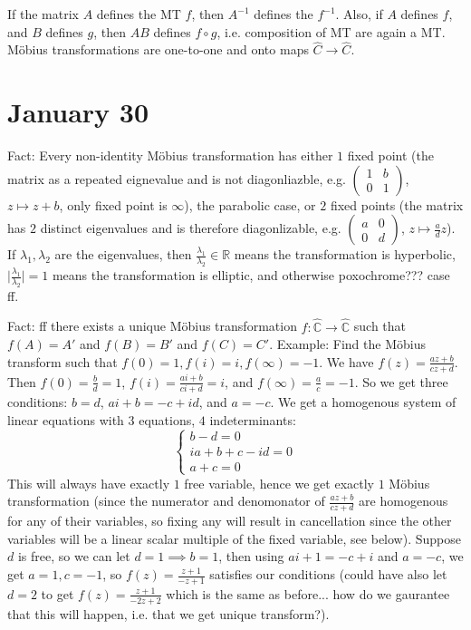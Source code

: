 \documentclass{article}
\theoremstyle{plain}
\theoremstyle{remark}
\newcommand{\R}{{\mathbb R}}
\newcommand{\C}{{\mathbb C}}
\begin{document}
If the matrix $A$ defines the MT $f$, then $A^{-1}$ defines the $f^{-1}$.
Also, if $A$ defines $f$, and $B$ defines $g$, then $AB$ defines $f \circ g$,
i.e. composition of MT are again a MT.
M\"{o}bius transformations are one-to-one and onto maps $\hat{C} \to \hat{C}$.

\section{January 30}
Fact: Every non-identity M\"{o}bius transformation has either 
$1$ fixed point (the matrix as a repeated eignevalue and is not diagonliazble,
e.g. $\begin{pmatrix} 1 & b \\ 0 & 1 \end{pmatrix}$, $z \mapsto z + b$,
only fixed point is $\infty$), the parabolic case,
or $2$ fixed points (the matrix has $2$ distinct eigenvalues
and is therefore diagonlizable,
e.g. $\begin{pmatrix} a & 0 \\ 0 & d \end{pmatrix}$, $z \mapsto \frac{a}{d}z$).
If $\lambda_1,\lambda_2$ are the eigenvalues, then $\frac{\lambda_1}{\lambda_2}\in\R$
means the transformation is hyperbolic,
$\lvert \frac{\lambda_1}{\lambda_2}\rvert = 1$ means the transformation is elliptic,
and otherwise poxochrome??? case ff.

Fact: ff there exists a unique M\"{o}bius transformation
$f \colon \hat{\C} \to \hat{\C}$ such that $f(A) = A'$
and $f(B) = B'$ and $f(C) = C'$.
Example: Find the M\"{o}bius transform such that
$f(0) = 1, f(i) = i, f(\infty) = -1$.
We have $f(z) = \frac{az+b}{cz+d}$.
Then $f(0) = \frac{b}{d} = 1$,
$f(i) = \frac{ai + b}{ci + d} = i$, and $f(\infty) = \frac{a}{c} = -1$.
So we get three conditions: $b = d$, $ai + b = -c + id$, and $a = -c$.
We get a homogenous system of linear equations with $3$ equations, $4$ indeterminants:
\[
	\begin{cases}
		b - d = 0\\
		ia + b + c -id = 0\\
		a + c = 0
	\end{cases}
\]
This will always have exactly $1$ free variable,
hence we get exactly $1$ M\"{o}bius transformation
(since the numerator and denomonator of $\frac{az+b}{cz+d}$ are
homogenous for any of their variables,
so fixing any will result in cancellation since the other variables
will be a linear scalar multiple of the fixed variable, see below).
Suppose $d$ is free, so we can let $d = 1 \implies b = 1$,
then using $ai + 1 = -c + i$ and $a = -c$, we get $a = 1, c = -1$,
so $f(z) = \frac{z+1}{-z+1}$ satisfies our conditions
(could have also let $d = 2$ to get $f(z) = \frac{z+1}{-2z+2}$ which is the same as before...
how do we gaurantee that this will happen, i.e. that we get unique transform?).
\end{document}
